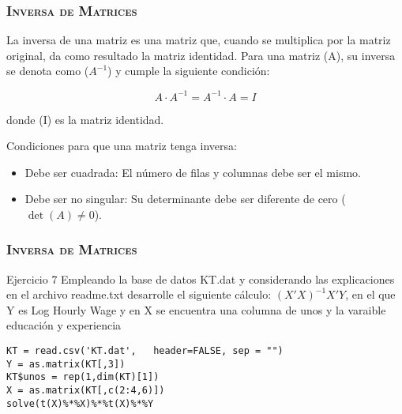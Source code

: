 \documentclass[16.5pt]{beamer}
\begin{document}
{
\begin{frame}
\frametitle{\textsc{\textbf{Inversa de Matrices}}}
\hspace*{-5mm}
\vspace*{-5mm} 
\vspace{0.3cm}

La inversa de una matriz es una matriz que, cuando se multiplica por la matriz original, da como resultado la matriz identidad. Para una matriz (A), su inversa se denota como ($A^{-1}$) y cumple la siguiente condición:

\[ A \cdot A^{-1} = A^{-1} \cdot A = I \]

donde (I) es la matriz identidad.

Condiciones para que una matriz tenga inversa:
\begin{itemize}
\item Debe ser cuadrada: El número de filas y columnas debe ser el mismo.
\item Debe ser no singular: Su determinante debe ser diferente de cero ($\det(A) \neq 0$).
\end{itemize}




\end{frame}
}
{
\begin{frame}
\frametitle{\textsc{\textbf{Inversa de Matrices}}}
\hspace*{-5mm}
\vspace*{-5mm} 
\vspace{0.3cm}
\begin{bclogo}{Ejercicio 7}
 {\color{blue} Empleando la base de datos KT.dat y considerando las explicaciones en el archivo readme.txt desarrolle el siguiente cálculo: $(X'X)^{-1}X'Y$, en el que Y es Log Hourly Wage  y en X se encuentra una columna de unos y la varaible educación y experiencia}
\begin{lstlisting}[basicstyle=\small]
KT = read.csv('KT.dat',   header=FALSE, sep = "")
Y = as.matrix(KT[,3])
KT$unos = rep(1,dim(KT)[1])
X = as.matrix(KT[,c(2:4,6)])
solve(t(X)%*%X)%*%t(X)%*%Y


\end{lstlisting}
\end{bclogo}

\end{frame}
}
\end{document}
